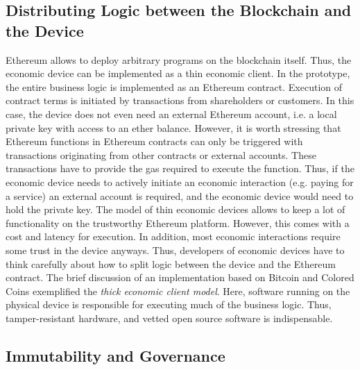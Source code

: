 \subsection{Distributing Logic between the Blockchain and the Device}
Ethereum allows to deploy arbitrary programs on the blockchain itself. Thus, the economic device can be implemented as a thin economic client. In the prototype, the entire business logic is implemented as an Ethereum contract. Execution of contract terms is initiated by transactions from shareholders or customers. In this case, the device does not even need an external Ethereum account, i.e. a local private key with access to an ether balance. However, it is worth stressing that Ethereum functions in Ethereum contracts can only be triggered with transactions originating from other contracts or external accounts. These transactions have to provide the gas required to execute the function. Thus, if the economic device needs to actively initiate an economic interaction (e.g. paying for a service) an external account is required, and the economic device would need to hold the private key. 
The model of thin economic devices allows to keep a lot of functionality on the trustworthy Ethereum platform. However, this comes with a cost and latency for execution. In addition, most economic interactions require some trust in the device anyways. Thus, developers of economic devices have to think carefully about how to split logic between the device and the Ethereum contract.
The brief discussion of an implementation based on Bitcoin and Colored Coins exemplified the \emph{thick economic client model}. Here, software running on the physical device is responsible for executing much of the business logic. Thus, tamper-resistant hardware, and vetted open source software is indispensable.

\subsection{Immutability and Governance}

